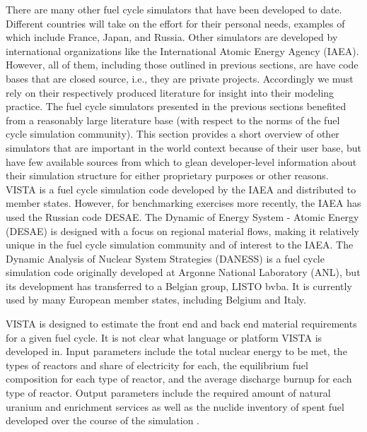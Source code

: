There are many other fuel cycle simulators that have been developed to
date. Different countries will take on the effort for their personal needs,
examples of which include France, Japan, and Russia. Other simulators are
developed by international organizations like the International Atomic Energy
Agency (IAEA). However, all of them, including those outlined in previous
sections, are have code bases that are closed source, i.e., they are private
projects. Accordingly we must rely on their respectively produced literature for
insight into their modeling practice. The fuel cycle simulators presented in the
previous sections benefited from a reasonably large literature base (with
respect to the norms of the fuel cycle simulation community). This section
provides a short overview of other simulators that are important in the world
context because of their user base, but have few available sources from which to
glean developer-level information about their simulation structure for either
proprietary purposes or other reasons. VISTA is a fuel cycle simulation code
developed by the IAEA and distributed to member states. However, for
benchmarking exercises more recently, the IAEA has used the Russian code
DESAE. The Dynamic of Energy System - Atomic Energy (DESAE) is designed with a
focus on regional material flows, making it relatively unique in the fuel cycle
simulation community and of interest to the IAEA. The Dynamic Analysis of
Nuclear System Strategies (DANESS) is a fuel cycle simulation code originally
developed at Argonne National Laboratory (ANL), but its development has
transferred to a Belgian group, LISTO bvba. It is currently used by many
European member states, including Belgium and Italy.

VISTA is designed to estimate the front end and back end material requirements
for a given fuel cycle. It is not clear what language or platform VISTA is
developed in. Input parameters include the total nuclear energy to be met, the
types of reactors and share of electricity for each, the equilibrium fuel
composition for each type of reactor, and the average discharge burnup for each
type of reactor. Output parameters include the required amount of natural
uranium and enrichment services as well as the nuclide inventory of spent fuel
developed over the course of the simulation \cite{iaea_nuclear_2007}.

